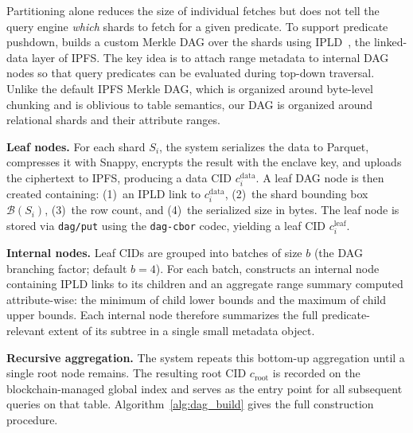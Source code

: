 Partitioning alone reduces the size of individual fetches but does not tell the query engine \emph{which} shards to fetch for a given predicate. To support predicate pushdown, \ours{} builds a custom Merkle DAG over the shards using IPLD~\cite{ipld2023spec}, the linked-data layer of IPFS. The key idea is to attach range metadata to internal DAG nodes so that query predicates can be evaluated during top-down traversal. Unlike the default IPFS Merkle DAG, which is organized around byte-level chunking and is oblivious to table semantics, our DAG is organized around relational shards and their attribute ranges.
 
\textbf{Leaf nodes.}
For each shard $S_i$, the system serializes the data to Parquet, compresses it with Snappy, encrypts the result with the enclave key, and uploads the ciphertext to IPFS, producing a data CID $c_i^{\text{data}}$. A leaf DAG node is then created containing: (1)~an IPLD link to $c_i^{\text{data}}$, (2)~the shard bounding box $\mathcal{B}(S_i)$, (3)~the row count, and (4)~the serialized size in bytes. The leaf node is stored via \texttt{dag/put} using the \texttt{dag-cbor} codec, yielding a leaf CID $c_i^{\text{leaf}}$.
 
\textbf{Internal nodes.}
Leaf CIDs are grouped into batches of size $b$ (the DAG branching factor; default $b = 4$). For each batch, \ours{} constructs an internal node containing IPLD links to its children and an aggregate range summary computed attribute-wise: the minimum of child lower bounds and the maximum of child upper bounds. Each internal node therefore summarizes the full predicate-relevant extent of its subtree in a single small metadata object.
 
\textbf{Recursive aggregation.}
The system repeats this bottom-up aggregation until a single root node remains. The resulting root CID $c_{\text{root}}$ is recorded on the blockchain-managed global index and serves as the entry point for all subsequent queries on that table. Algorithm~\ref{alg:dag_build} gives the full construction procedure.
 
